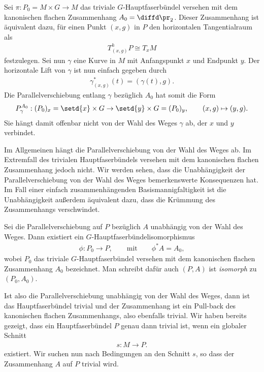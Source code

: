 \documentclass[%
	paper=a5,%
	fleqn,%
	DIV=18,%
	BCOR=0mm,
	fontsize=11pt,
	titlepage=false,%
	bibliography=totoc,
	DIV=18,%
	twoside=true,
	pdftitle=Riemannsche Geometrie,
	pdfauthor=Uwe Semmelmann,
	numbers=noendperiod]%
	{scrbook}
\begin{document}
\begin{ex}
\begin{exenum}
\item
\label{ex:Parallelverschiebung-unabhängig-kanonisch-flach}
Sei $\pi: P_0 = M\times G\to M$ das triviale $G$-Hauptfaserbündel versehen mit
dem kanonischen flachen Zusammenhang $A_0=\diffd \pr_2$. Dieser Zusammenhang ist
äquivalent dazu, für einen Punkt $(x,g)$ in $P$ den horizontalen Tangentialraum
als
\begin{align*}
T_{(x,g)}^hP \cong T_xM
\end{align*}
festzulegen. Sei nun $\gamma$ eine Kurve in $M$ mit Anfangspunkt $x$ und
Endpunkt $y$. Der horizontale Lift von $\gamma$ ist nun einfach gegeben durch
\begin{align*}
\gamma_{(x,g)}^*(t) = (\gamma(t),g).
\end{align*}
Die Parallelverschiebung entlang $\gamma$ bezüglich $A_0$ hat somit die Form
\begin{align*}
P_\gamma^{A_0} : (P_0)_x = \setd{x}\times G\to \setd{y}\times G = (P_0)_y,\qquad
(x,g) \mapsto (y,g).
\end{align*}
Sie hängt damit offenbar nicht von der Wahl des Weges $\gamma$ ab, der $x$ und
$y$ verbindet.\bsp
\end{exenum}
\end{ex}

Im Allgemeinen hängt die Parallelverschiebung von der Wahl des Weges ab. Im
Extremfall des trivialen Hauptfaserbündels versehen mit dem kanonischen flachen
Zusammenhang jedoch nicht. Wir werden sehen, dass die Unabhängigkeit der
Parallelverschiebung von der Wahl des Weges bemerkenswerte Konsequenzen hat.
Im Fall einer einfach zusammenhängenden Basismannigfaltigkeit ist die
Unabhängigkeit außerdem äquivalent dazu, dass die Krümmung des Zusammenhangs
verschwindet.

\begin{prop}
Sei die Parallelverschiebung auf $P$ bezüglich $A$ unabhängig von der Wahl des
Weges. Dann existiert ein $G$-Hauptfaserbündelisomorphismus
\begin{align*}
\phi: P_0\to P,\qquad \text{mit}\qquad \phi^* A = A_0,
\end{align*}
wobei $P_0$ das triviale $G$-Hauptfaserbündel versehen mit dem kanonischen
flachen Zusammenhang $A_0$ bezeichnet. Man schreibt dafür auch $(P,A)$ ist
\emph{isomorph} zu $(P_0,A_0)$.\fish
\end{prop}

Ist also die Parallelverschiebung unabhängig von der Wahl des Weges, dann ist
das Hauptfaserbündel trivial und der Zusammenhang ist ein Pull-back des
kanonischen flachen Zusammenhangs, also ebenfalls trivial. Wir haben bereits
gezeigt, dass ein Hauptfaserbündel $P$ genau dann trivial ist, wenn ein
globaler Schnitt
\begin{align*}
s: M\to P.
\end{align*}
existiert. Wir suchen nun nach Bedingungen an den Schnitt $s$, so dass der
Zusammenhang $A$ auf $P$ trivial wird.
\end{document}
